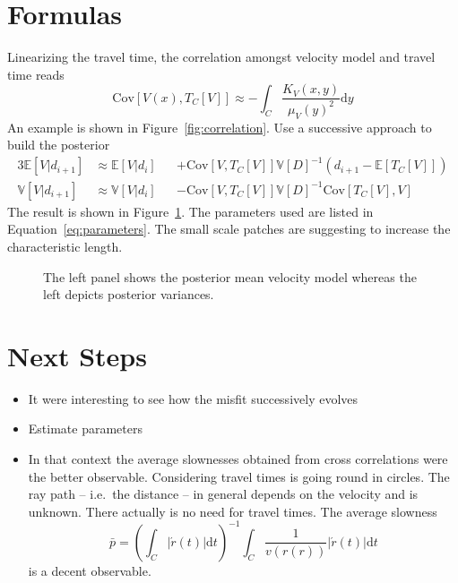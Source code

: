 \documentclass[11pt]{article}
\newcommand\Mean[1]{\mathbb{E}\!\left[#1\right]}
\newcommand\Var[1]{\mathbb{V}\!\left[#1\right]}
\newcommand\Cov[2]{\mathrm{Cov}\!\left[#1,#2\right]}
\begin{document}
\section{Formulas}

Linearizing the travel time, the correlation amongst velocity model and travel time reads
\begin{equation}
    \Cov{V(x)}{T_C[V]} \approx -\int_C \frac{K_V(x,y)}{\mu_V(y)^2}  \mathrm d y
\end{equation}
An example is shown in Figure~\ref{fig:correlation}.
Use a successive approach to build the posterior
\begin{alignat}{3}
    \Mean{V|d_{i+1}} &\approx \Mean{V|d_i} &&+ \Cov{V}{T_C[V]}\Var{D}^{-1} \left(d_{i+1}-\Mean{T_C[V]}\right)
    \\
    \Var{V|d_{i+1}}  &\approx \Var{V|d_i}  &&- \Cov{V}{T_C[V]}\Var{D}^{-1}  \Cov{T_C[V]}{V}
\end{alignat}
The result is shown in Figure~\ref{fig:example}. The parameters used are listed in Equation~\ref{eq:parameters}.
The small scale patches are suggesting to increase the characteristic length.

\begin{figure}
    \centering
    
    \caption{The left panel shows the posterior mean velocity model whereas the left depicts posterior variances. }
    \label{fig:example}
\end{figure}


\section{Next Steps}

\begin{itemize}
    \item It were interesting to see how the misfit successively evolves
    \item Estimate parameters
    \item In that context the average slownesses obtained from cross correlations were the better observable.
        Considering travel times is going round in circles.
        The ray path -- i.e.~the distance -- in general depends on the velocity and is unknown.
        There actually is no need for travel times.
        The average slowness
        \begin{equation}
            \bar p = \left(\int_C |\acute r(t)| \mathrm d t \right)^{-1} \int_C \frac 1 {v(r(r))} |\acute r(t)| \mathrm d t
        \end{equation}
        is a decent observable.

\end{itemize}
\end{document}
